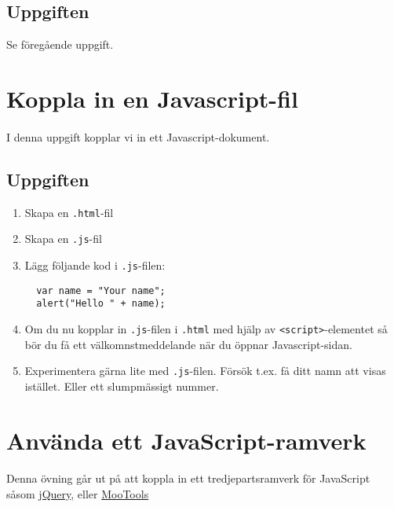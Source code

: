\documentclass{article}
\begin{document}
    \subsection*{Uppgiften}
      Se föregående uppgift.





  \newpage
  \section{ Koppla in en Javascript-fil }
    \paragraph{}
    I denna uppgift kopplar vi in ett Javascript-dokument.

    \subsection*{Uppgiften}
      \begin{enumerate}
        \item Skapa en \texttt{.html}-fil
        \item Skapa en \texttt{.js}-fil
        \item Lägg följande kod i \texttt{.js}-filen:
          \begin{lstlisting}
  var name = "Your name";
  alert("Hello " + name);
          \end{lstlisting}
        \item Om du nu kopplar in \texttt{.js}-filen i \texttt{.html} med hjälp av \texttt{<script>}-elementet så bör du få ett välkomnstmeddelande när du öppnar Javascript-sidan.
        \item Experimentera gärna lite med \texttt{.js}-filen. Försök t.ex. få ditt namn att visas istället. Eller ett slumpmässigt nummer.
      \end{enumerate}




  \newpage
  \section{ Använda ett JavaScript-ramverk }
    \paragraph{}
    Denna övning går ut på att koppla in ett tredjepartsramverk för JavaScript såsom
    \href{http://jquery.com/download/}{jQuery}, eller
    \href{http://mootools.net/}{MooTools}
\end{document}
